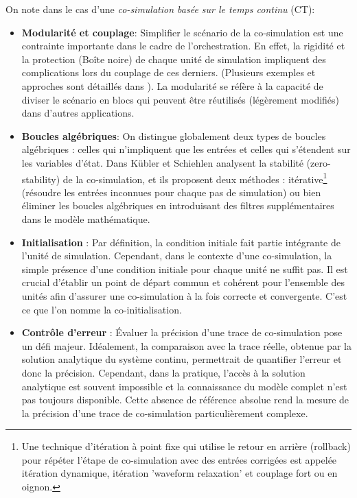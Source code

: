 On note dans le cas d'une \textit{co-simulation basée sur le temps continu} (CT): 
\begin{itemize}
  \item \textbf{Modularité et couplage}: Simplifier le scénario de la co-simulation est une contrainte importante dans le cadre de l'orchestration. En effet, la rigidité et la protection (Boîte noire) de chaque unité de simulation impliquent des complications lors du couplage de ces derniers. (Plusieurs exemples et approches sont détaillés dans \cite{b7}). La modularité se réfère à la capacité de diviser le scénario en blocs qui peuvent être réutilisés (légèrement modifiés) dans d'autres applications.
  \item \textbf{Boucles algébriques}: On distingue globalement deux types de boucles algébriques : celles qui n'impliquent que les entrées et celles qui s'étendent sur les variables d'état. Dans \cite{b12} Kübler et Schiehlen  analysent la stabilité (zero-stability) de la co-simulation, et ils proposent deux méthodes : itérative\footnote{Une technique d'itération à point fixe qui utilise le retour en arrière (rollback) pour répéter l'étape de co-simulation avec des entrées corrigées est appelée itération dynamique, itération 'waveform relaxation' et couplage fort ou en oignon.} (résoudre les entrées inconnues pour chaque pas de simulation) ou bien éliminer les boucles algébriques en introduisant des filtres supplémentaires dans le modèle mathématique. 
  \item \textbf{Initialisation} : Par définition, la condition initiale fait partie intégrante de l'unité de simulation. Cependant, dans le contexte d'une co-simulation, la simple présence d'une condition initiale pour chaque unité ne suffit pas. Il est crucial d'établir un point de départ commun et cohérent pour l'ensemble des unités afin d'assurer une co-simulation à la fois correcte et convergente. C'est ce que l'on nomme la co-initialisation.
  \item \textbf{Contrôle d'erreur} : Évaluer la précision d'une trace de co-simulation pose un défi majeur. Idéalement, la comparaison avec la trace réelle, obtenue par la solution analytique du système continu, permettrait de quantifier l'erreur et donc la précision. Cependant, dans la pratique, l'accès à la solution analytique est souvent impossible et la connaissance du modèle complet n'est pas toujours disponible. Cette absence de référence absolue rend la mesure de la précision d'une trace de co-simulation particulièrement complexe.
\end{itemize}

